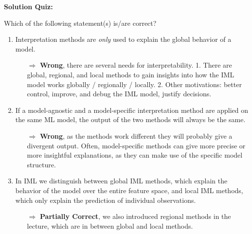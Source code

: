 \textbf{Solution Quiz:}\\\noindent
\medskip

Which of the following statement(s) is/are correct?  
	\begin{enumerate}
        \item Interpretation methods are \textit{only} used to explain the global behavior of a model.
        \begin{itemize}
        	\item[$\Rightarrow$] \textbf{Wrong}, there are several needs for interpretability. 1. There are global, regional, and local methods to gain insights into how the IML model works globally / regionally / locally. 2. Other motivations: better control, improve, and debug the IML model, justify decisions.
        \end{itemize}
    	\item If a model-agnostic and a model-specific interpretation method are applied on the same ML model, the output of the two methods will always be the same.
    	\begin{itemize}
    		\item[$\Rightarrow$] \textbf{Wrong}, as the methods work different they will probably give a divergent output. Often, model-specific methods can give more precise or more insightful explanations, as they can make use of the specific model structure.
    	\end{itemize}
    	\item In IML we distinguish between global IML methods, which explain the behavior of the model over the entire feature space, and local IML methods, which only explain the prediction of individual observations. 
    	\begin{itemize}
    		\item[$\Rightarrow$] \textbf{Partially Correct}, we also introduced regional methods in the lecture, which are in between global and local methods.
    	\end{itemize}

\end{enumerate}
